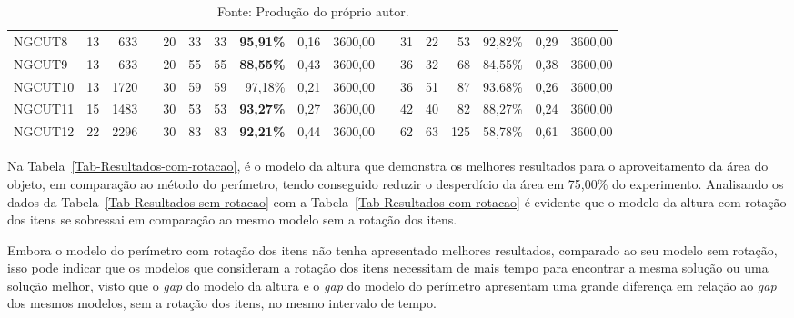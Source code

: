 \documentclass[10pt, a4paper]{article}
\begin{document}
\begin{table}[H]
{\begin{tabular}{l *{16}{r}}
                    NGCUT8  & 13 &  633     && 20 & 33 & 33 &  \textbf{95,91\%} & 0,16 & 3600,00    && 31 & 22 &  53 & 92,82\% & 0,29 & 3600,00    \\
                    NGCUT9  & 13 &  633     && 20 & 55 & 55 &  \textbf{88,55\%} & 0,43 & 3600,00    && 36 & 32 &  68 & 84,55\% & 0,38 & 3600,00    \\
                    NGCUT10 & 13 & 1720     && 30 & 59 & 59 &           97,18\% & 0,21 & 3600,00    && 36 & 51 &  87 & 93,68\% & 0,26 & 3600,00    \\
                    NGCUT11 & 15 & 1483     && 30 & 53 & 53 &  \textbf{93,27\%} & 0,27 & 3600,00    && 42 & 40 &  82 & 88,27\% & 0,24 & 3600,00    \\
                    NGCUT12 & 22 & 2296     && 30 & 83 & 83 &  \textbf{92,21\%} & 0,44 & 3600,00    && 62 & 63 & 125 & 58,78\% & 0,61 & 3600,00    \\
                    \bottomrule
                \end{tabular}
            }
            \caption*{Fonte: Produção do próprio autor.}    %
        \end{table}
    
        Na Tabela~\ref{Tab-Resultados-com-rotacao}, é o modelo da altura que demonstra os melhores resultados para o aproveitamento da área do objeto, em comparação ao método do perímetro, tendo conseguido reduzir o desperdício da área em 75,00\% do experimento. Analisando os dados da Tabela~\ref{Tab-Resultados-sem-rotacao} com a Tabela~\ref{Tab-Resultados-com-rotacao} é evidente que o modelo da altura com rotação dos itens se sobressai em comparação ao mesmo modelo sem a rotação dos itens.

        \newpage
        Embora o modelo do perímetro com rotação dos itens não tenha apresentado melhores resultados, comparado ao seu modelo sem rotação, isso pode indicar que os modelos que consideram a rotação dos itens necessitam de mais tempo para encontrar a mesma solução ou uma solução melhor, visto que o \emph{gap} do modelo da altura e o \emph{gap} do modelo do perímetro apresentam uma grande diferença em relação ao \emph{gap} dos mesmos modelos, sem a rotação dos itens, no mesmo intervalo de tempo.
    
\end{document}
